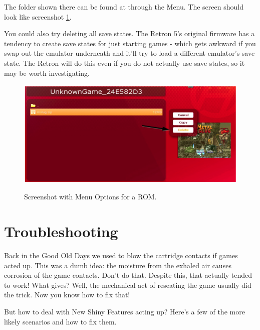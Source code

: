 \documentclass[a4paper]{article}
\begin{document}
The folder shown there can be found at  through the Menu. The screen should look like screenshot \ref{fig:unknown-game}.


You could also try deleting all save states. The Retron 5's original firmware has a tendency to create save states for just starting games - which gets awkward if you swap out the emulator underneath and it'll try to load a different emulator's save state. The Retron will do this even if you do not actually use save states, so it may be worth investigating.

\begin{figure}[h]
\caption{Screenshot with Menu Options for a ROM.}
\includegraphics[width=\textwidth]{unknown-game}
\label{fig:unknown-game}
\end{figure}

\section{Troubleshooting}

Back in the Good Old Days we used to blow the cartridge contacts if games acted up. This was a dumb idea: the moisture from the exhaled air causes corrosion of the game contacts. Don't do that. Despite this, that actually tended to work! What gives? Well, the mechanical act of reseating the game usually did the trick. Now you know how to fix that!

But how to deal with New Shiny Features acting up? Here's a few of the more likely scenarios and how to fix them.
\end{document}
